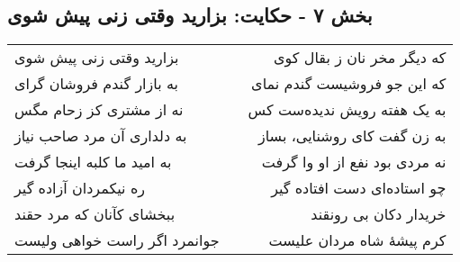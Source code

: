 \begin{center}
\section*{بخش ۷ - حکایت: بزارید وقتی زنی پیش شوی}
\label{sec:007}
\begin{longtable}{l p{0.5cm} r}
بزارید وقتی زنی پیش شوی
&&
که دیگر مخر نان ز بقال کوی
\\
به بازار گندم فروشان گرای
&&
که این جو فروشیست گندم نمای
\\
نه از مشتری کز زحام مگس
&&
به یک هفته رویش ندیده‌ست کس
\\
به دلداری آن مرد صاحب نیاز
&&
به زن گفت کای روشنایی، بساز
\\
به امید ما کلبه اینجا گرفت
&&
نه مردی بود نفع از او وا گرفت
\\
ره نیکمردان آزاده گیر
&&
چو استاده‌ای دست افتاده گیر
\\
ببخشای کآنان که مرد حقند
&&
خریدار دکان بی رونقند
\\
جوانمرد اگر راست خواهی ولیست
&&
کرم پیشهٔ شاه مردان علیست
\\
\end{longtable}
\end{center}
